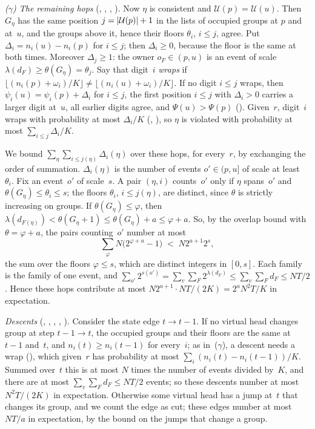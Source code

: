 \begin{outline}
\emph{($\gamma$) The remaining hops} (, , ,
). Now $\eta$ is consistent and $\mathcal U(p)=\mathcal U(u)$. Then $G_\eta$ has the same
position $j=\lvert \mathcal U(p) \rvert+1$ in the lists of occupied groups at $p$ and at~$u$, and the groups above it, hence
their floors $\theta_i$, $i\le j$, agree. Put $\Delta_i=n_i(u)-n_i(p)$ for $i\le j$; then $\Delta_i\ge0$, because the
floor is the same at both times. Moreover $\Delta_j\ge1$: the owner $o_F\in(p,u)$ is an event of scale
$\lambda(d_F)\ge\theta(G_\eta)=\theta_j$. Say that digit~$i$ \emph{wraps} if
$\lfloor(n_i(p)+\omega_i)/K\rfloor\ne\lfloor(n_i(u)+\omega_i)/K\rfloor$. If no digit $i\le j$ wraps, then
$\psi_i(u)=\psi_i(p)+\Delta_i$ for $i\le j$, the first position $i\le j$ with $\Delta_i>0$ carries a larger digit at~$u$,
all earlier digits agree, and $\Psi(u)>\Psi(p)$ (). Given~$r$, digit~$i$ wraps with probability
at most $\Delta_i/K$ (, ), so $\eta$ is violated with probability at most
$\sum_{i\le j}\Delta_i/K$.

We bound $\sum_\eta\sum_{i\le j(\eta)}\Delta_i(\eta)$ over these hops, for every~$r$, by exchanging the order of
summation. $\Delta_i(\eta)$ is the number of events $o'\in(p,u]$ of scale at least~$\theta_i$. Fix an event~$o'$ of
scale~$s$. A pair $(\eta,i)$ counts~$o'$ only if $\eta$ spans~$o'$ and $\theta(G_\eta)\le\theta_i\le s$; the floors
$\theta_i$, $i\le j(\eta)$, are distinct, since $\theta$ is strictly increasing on groups. If $\theta(G_\eta)\le\varphi$,
then $\lambda(d_{F(\eta)})<\theta(G_\eta+1)\le\theta(G_\eta)+a\le\varphi+a$. So, by the overlap bound with $\theta=\varphi+a$,
the pairs
counting~$o'$ number at most
\[
  \sum_{\varphi}N\bigl(2^{\varphi+a}-1\bigr)\;<\;N2^{a+1}2^s,
\]
the sum over the floors $\varphi\le s$, which are distinct integers in $[0,s]$. Each family is the family of one event, and
$\sum_{o'}2^{s(o')}=\sum_v\sum_F2^{\lambda(d_F)}\le\sum_v\sum_Fd_F\le NT/2$. Hence these hops contribute at most
$N2^{a+1}\cdot NT/(2K)=2^aN^2T/K$ in expectation.

\emph{Descents} (, , , ,
). Consider the state edge $t\to t-1$. If no virtual head changes group at step $t-1\to t$, the
occupied groups and their floors are the same at $t-1$ and~$t$, and $n_i(t)\ge n_i(t-1)$ for every~$i$; as in~($\gamma$), a
descent needs a wrap (), which given~$r$ has probability at most $\sum_i(n_i(t)-n_i(t-1))/K$.
Summed over~$t$ this is at most $N$ times the number of events divided by~$K$, and there are at most
$\sum_v\sum_Fd_F\le NT/2$ events; so these descents number at most $N^2T/(2K)$ in expectation. Otherwise some virtual head
has a jump at~$t$ that changes its group, and we count the edge as cut; these edges number at most $NT/a$ in expectation,
by the bound on the jumps that change a group.


\end{outline}
